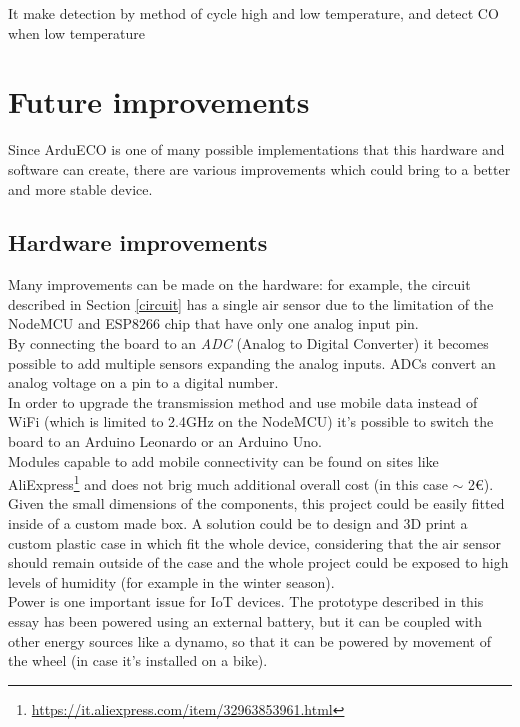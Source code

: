 \documentclass[conference]{IEEEtran}
\begin{document}
	It make detection by method of cycle high and low temperature, and detect CO when low temperature \cite{mq7}


\section{Future improvements}\label{improvements}
	Since ArduECO is one of many possible implementations that this hardware and software can create, there are various improvements which could bring to a better and more stable device.
	
	\subsection{Hardware improvements}
		Many improvements can be made on the hardware: for example, the circuit described in Section \ref{circuit} has a single air sensor due to the limitation of the NodeMCU and ESP8266 chip that have only one analog input pin.\\
		By connecting the board to an \textit{ADC} (Analog to Digital Converter) it becomes possible to add multiple sensors expanding the analog inputs.
		ADCs convert an analog voltage on a pin to a digital number\cite{adc}.\\
		In order to upgrade the transmission method and use mobile data instead of WiFi (which is limited to 2.4GHz on the NodeMCU) it's possible to switch the board to an Arduino Leonardo or an Arduino Uno.\\
		Modules capable to add mobile connectivity can be found on sites like AliExpress\footnote{\href{https://it.aliexpress.com/item/32963853961.html}{https://it.aliexpress.com/item/32963853961.html}} and does not brig much additional overall cost (in this case $ \sim $ 2\euro).\\
		Given the small dimensions of the components, this project could be easily fitted inside of a custom made box.
		A solution could be to design and 3D print a custom plastic case in which fit the whole device, considering that the air sensor should remain outside of the case and the whole project could be exposed to high levels of humidity (for example in the winter season).\\
		Power is one important issue for IoT devices.
		The prototype described in this essay has been powered using an external battery, but it can be coupled with other energy sources like a dynamo, so that it can be powered by movement of the wheel (in case it's installed on a bike).
	
\end{document}
